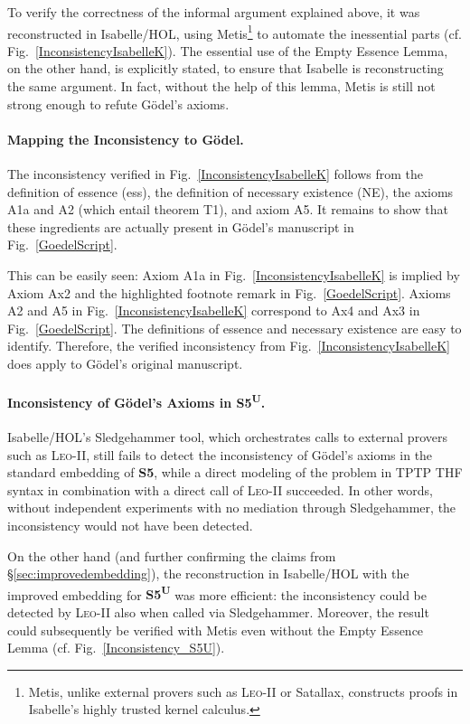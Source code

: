 \documentclass{llncs}
\newcommand{\logic}[1]{\textbf{#1}\xspace}
\newcommand{\SFive}{\logic{S5}}
\newcommand{\SFiveU}{\logic{S5\textsuperscript{U}}}
\begin{document}
To verify the correctness of the informal argument explained above, it
was reconstructed in Isabelle/HOL, using Metis\footnote{Metis, unlike
  external provers such as \textsc{Leo-II} or Satallax, 
  constructs proofs in Isabelle's highly trusted kernel calculus.} to automate the
inessential parts (cf. Fig.~\ref {InconsistencyIsabelleK}). The essential use of the Empty Essence Lemma, on
the other hand, is explicitly stated, to ensure that Isabelle is
reconstructing the same argument. In fact, without the help of this
lemma, Metis is still not strong enough to refute G\"odel's
axioms.


\paragraph{Mapping the Inconsistency to G\"odel.}
The inconsistency verified in Fig.~\ref{InconsistencyIsabelleK} follows from the definition of
essence (ess), the definition of necessary existence (NE), the
axioms A1a and A2 (which entail theorem T1), and axiom A5. It remains to show that
these ingredients are actually present in G\"odel's manuscript in
Fig.~\ref{GoedelScript}. 


This can be easily seen: Axiom A1a in
Fig.~\ref{InconsistencyIsabelleK} is implied by Axiom Ax2 and the
highlighted footnote remark in Fig.~\ref{GoedelScript}. Axioms A2 and
A5 in Fig.~\ref{InconsistencyIsabelleK} correspond to Ax4 and Ax3 in
Fig.~\ref{GoedelScript}. The definitions of essence and necessary
existence are easy to identify. Therefore, the verified
inconsistency from Fig.~\ref{InconsistencyIsabelleK} does apply to 
G\"odel's original manuscript.


\paragraph{Inconsistency of G\"odel's Axioms in \SFiveU.}
Isabelle/HOL's Sledgehammer tool, which orchestrates calls to
external provers such as \textsc{Leo-II}, still
fails to detect the inconsistency of G\"odel's axioms in the standard
embedding of \SFive, while a direct modeling of the problem in TPTP THF syntax
in combination with a direct call of \textsc{Leo-II} succeeded. In
other words, without independent experiments with no mediation through Sledgehammer, the
inconsistency would not have been detected.


On the other hand (and further confirming the claims from \S\ref{sec:improvedembedding}), 
the reconstruction in Isabelle/HOL with the improved embedding for \SFiveU was more efficient: 
the inconsistency could be detected
by \textsc{Leo-II} also when called via
Sledgehammer. Moreover, the result could subsequently be verified with
Metis even without the Empty Essence Lemma (cf. Fig.~\ref{Inconsistency_S5U}). 
\end{document}
